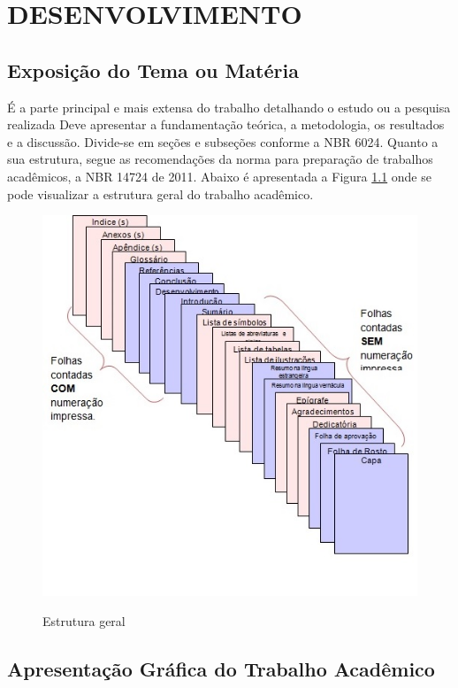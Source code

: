 \chapter{DESENVOLVIMENTO}

\section{Exposição do Tema ou Matéria}

É a parte principal e mais extensa do trabalho detalhando o estudo ou a pesquisa realizada Deve apresentar a fundamentação teórica, a metodologia, os resultados e a discussão. Divide-se em seções e subseções conforme a NBR 6024. Quanto a sua estrutura, segue as recomendações da norma para preparação de trabalhos acadêmicos, a NBR 14724 de 2011. \cite{ABNT} 
Abaixo é apresentada a Figura \ref{fig:estrutura} onde se pode visualizar a estrutura geral do trabalho acadêmico.

\begin{figure}[htb]
	\caption{Estrutura geral}
    \centering
    {\parbox{16cm}{
	    \includegraphics[width=16cm]{images/Fig1.jpg}
        \label{fig:estrutura}
    }}
\end{figure}


\section{Apresentação Gráfica do Trabalho Acadêmico}

